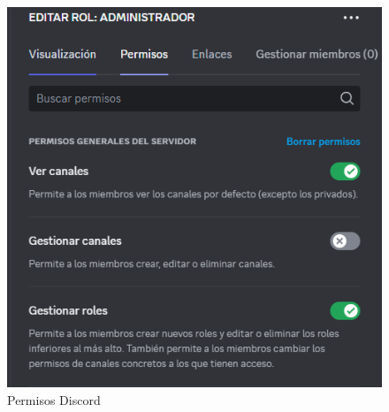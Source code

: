 \begin{figure}[h]
\centering
\includegraphics[width=0.6\linewidth]{Imagenes/Discord.png}
\caption{Permisos Discord}
\label{Permisos Discord}
\end{figure}
\FloatBarrier